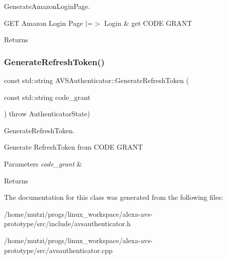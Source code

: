 Generate\+Amazon\+Login\+Page. 

G\+ET Amazon Login Page $\vert$=$>$ Login \& get C\+O\+DE G\+R\+A\+NT \begin{DoxyReturn}{Returns}

\end{DoxyReturn}
\mbox{\label{classAVSAuthenticator_ab08c84db0227d93f3a23713bd9970c95}} 
\subsubsection{\texorpdfstring{Generate\+Refresh\+Token()}{GenerateRefreshToken()}}
{\footnotesize\ttfamily const std\+::string A\+V\+S\+Authenticator\+::\+Generate\+Refresh\+Token (\begin{DoxyParamCaption}\item[{const std\+::string}]{code\+\_\+grant }\end{DoxyParamCaption}) throw  Authenticator\+State) }



Generate\+Refresh\+Token. 

Generate Refresh\+Token from C\+O\+DE G\+R\+A\+NT 
\begin{DoxyParams}{Parameters}
{\em code\+\_\+grant} & \\
\hline
\end{DoxyParams}
\begin{DoxyReturn}{Returns}

\end{DoxyReturn}


The documentation for this class was generated from the following files\+:\begin{DoxyCompactItemize}
\item 
/home/mutzi/progs/linux\+\_\+workspace/alexa-\/avs-\/prototype/src/include/avsauthenticator.\+h\item 
/home/mutzi/progs/linux\+\_\+workspace/alexa-\/avs-\/prototype/src/avsauthenticator.\+cpp\end{DoxyCompactItemize}
